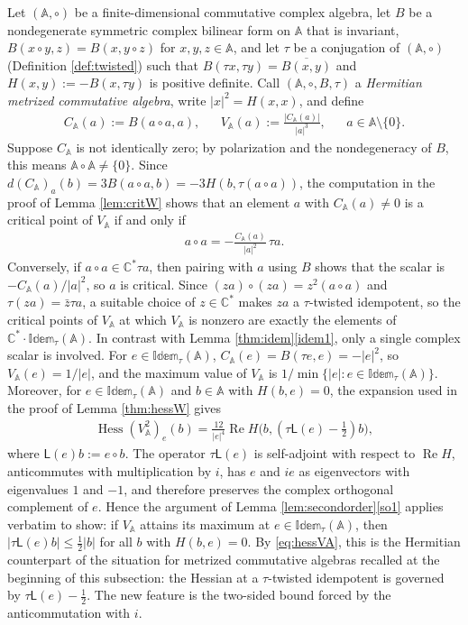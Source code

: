 \documentclass[leqno,10pt]{amsart}
\theoremstyle{definition}
\numberwithin{equation}{section}
\newcommand{\idem}{\mathbb{Idem}}
\newcommand{\alg}{\mathbb{A}}
\newcommand{\mlt}{\circ}
\newcommand{\hess}{\operatorname{Hess}}
\newcommand{\lin}{\mathsf{L}}
\newcommand{\re}{\operatorname{Re}}
\newcommand{\com}{\mathbb C}
\newcommand{\nnorm}[1]{\lvert #1\rvert}%
\begin{document}
Let $(\alg, \mlt)$ be a finite-dimensional commutative complex algebra, let $B$ be a nondegenerate symmetric complex bilinear form on $\alg$ that is invariant, $B(x \mlt y, z) = B(x, y \mlt z)$ for $x, y, z \in \alg$, and let $\tau$ be a conjugation of $(\alg, \mlt)$ (Definition \ref{def:twisted}) such that $B(\tau x, \tau y) = \overline{B(x, y)}$ and $H(x, y) := -B(x, \tau y)$ is positive definite. Call $(\alg, \mlt, B, \tau)$ a \emph{Hermitian metrized commutative algebra}, write $\nnorm{x}^{2} = H(x, x)$, and define
\begin{align}\label{eq:VA}
&C_{\alg}(a) := B(a \mlt a, a),& &V_{\alg}(a) := \frac{|C_{\alg}(a)|}{\nnorm{a}^{3}},& &a \in \alg \setminus \{0\}.&
\end{align}
Suppose $C_{\alg}$ is not identically zero; by polarization and the nondegeneracy of $B$, this means $\alg \mlt \alg \neq \{0\}$. Since $d(C_{\alg})_{a}(b) = 3B(a \mlt a, b) = -3H(b, \tau(a \mlt a))$, the computation in the proof of Lemma \ref{lem:critW} shows that an element $a$ with $C_{\alg}(a) \neq 0$ is a critical point of $V_{\alg}$ if and only if
\begin{align}\label{eq:VAcrit}
a \mlt a = -\frac{C_{\alg}(a)}{\nnorm{a}^{2}}\,\tau a.
\end{align}
Conversely, if $a \mlt a \in \com^{\ast}\tau a$, then pairing with $a$ using $B$ shows that the scalar is $-C_{\alg}(a)/\nnorm{a}^{2}$, so $a$ is critical. Since $(za) \mlt (za) = z^{2}(a \mlt a)$ and $\tau(za) = \bar{z}\tau a$, a suitable choice of $z \in \com^{\ast}$ makes $za$ a $\tau$-twisted idempotent, so the critical points of $V_{\alg}$ at which $V_{\alg}$ is nonzero are exactly the elements of $\com^{\ast}\cdot\idem_{\tau}(\alg)$. In contrast with Lemma \ref{thm:idem}\ref{idem1}, only a single complex scalar is involved. For $e \in \idem_{\tau}(\alg)$, $C_{\alg}(e) = B(\tau e, e) = -\nnorm{e}^{2}$, so $V_{\alg}(e) = 1/\nnorm{e}$, and the maximum value of $V_{\alg}$ is $1/\min\{\nnorm{e}: e \in \idem_{\tau}(\alg)\}$. Moreover, for $e \in \idem_{\tau}(\alg)$ and $b \in \alg$ with $H(b, e) = 0$, the expansion used in the proof of Lemma \ref{thm:hessW} gives
\begin{align}\label{eq:hessVA}
\hess(V_{\alg}^{2})_{e}(b) = \frac{12}{\nnorm{e}^{4}}\re H\big(b, (\tau\lin(e) - \tfrac{1}{2})b\big),
\end{align}
where $\lin(e)b := e \mlt b$. The operator $\tau\lin(e)$ is self-adjoint with respect to $\re H$, anticommutes with multiplication by $i$, has $e$ and $ie$ as eigenvectors with eigenvalues $1$ and $-1$, and therefore preserves the complex orthogonal complement of $e$. Hence the argument of Lemma \ref{lem:secondorder}\ref{so1} applies verbatim to show: if $V_{\alg}$ attains its maximum at $e \in \idem_{\tau}(\alg)$, then $\nnorm{\tau\lin(e)b} \leq \tfrac{1}{2}\nnorm{b}$ for all $b$ with $H(b, e) = 0$. By \eqref{eq:hessVA}, this is the Hermitian counterpart of the situation for metrized commutative algebras recalled at the beginning of this subsection: the Hessian at a $\tau$-twisted idempotent is governed by $\tau\lin(e) - \tfrac{1}{2}$. The new feature is the two-sided bound forced by the anticommutation with $i$.
\end{document}
